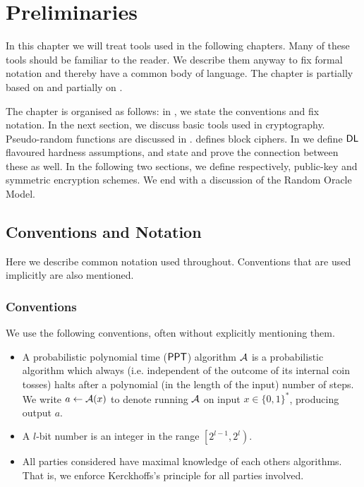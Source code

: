 \chapter{Preliminaries}
In this chapter we will treat tools used in the following chapters. Many of these tools should be familiar to the reader. We describe them anyway to fix formal notation and thereby have a common body of language. The chapter is partially based on \cite{Katz:2007:IMC:1206501} and partially on \cite{Goldreich:2006:FCV:1202577}.

The chapter is organised as follows: in , we state the conventions and fix notation. In the next section, we discuss basic tools used in cryptography. Pseudo-random functions are discussed in .  defines block ciphers. In  we define $\mathsf{DL}$ flavoured hardness assumptions, and state and prove the connection between these as well. In the following two sections, we define respectively, public-key and symmetric encryption schemes. We end with a discussion of the Random Oracle Model.

\section{Conventions and Notation}

Here we describe common notation used throughout. Conventions that are used implicitly are also mentioned.

\subsection{Conventions} 

We use the following conventions, often without explicitly mentioning them.  

\begin{itemize}
	\itemsep-0.1em
	\item A probabilistic polynomial time ($\mathsf{PPT}$) algorithm $\mathcal{A}$ is a probabilistic algorithm which always (i.e. independent of the outcome of its internal coin tosses) halts after a polynomial (in the length of the input) number of steps. We write $a\leftarrow\mathcal{A}(x)$ to denote running $\mathcal{A}$ on input $x\in\{0,1\}^*$, producing output $a$. 
	\item A $l$-bit number is an integer in the range $\left[2^{l-1},2^l\right)$.
	\item All parties considered have maximal knowledge of each others algorithms. That is, we enforce Kerckhoffs's principle for all parties involved. 
\end{itemize}

